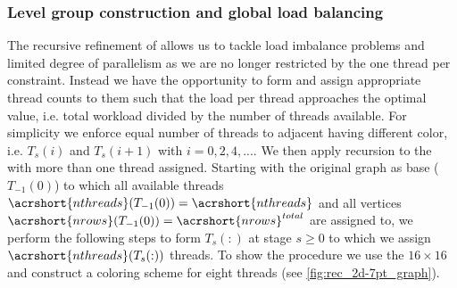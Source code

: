 \subsubsection{Level group construction and global load balancing} \label{subsec:subgraph_selection}

The recursive refinement of \levelGroups allows us to tackle load imbalance problems and limited degree of parallelism as we are no longer restricted by the one thread per \levelGroup constraint.  Instead we have the opportunity to form \levelGroups and assign appropriate thread counts to them such that the load per thread approaches the optimal value, i.e. total workload divided by the number of threads available. For simplicity we enforce equal number of threads to adjacent \levelGroups having different color, i.e. $T_s(i)$ and $T_s(i+1)$ with $i=0,2,4,...$. We then apply recursion to the \levelGroups with more than one thread assigned. Starting with the original graph as base \levelGroup ($T_{-1}(0)$) to which all available threads $\acrshort{nthreads}(T_{-1}(0))=\acrshort{nthreads}$ and all vertices $\acrshort{nrows}(T_{-1}(0))=\acrshort{nrows}^{total}$ are assigned to, we perform the following steps to form \levelGroups $T_s(:)$ at stage $s \ge 0$  to which we assign $\acrshort{nthreads}(T_{s}(:))$ threads. To show the procedure we use the $16 \times 16$ \stex and construct a coloring scheme for eight threads (see \cref{fig:rec_2d-7pt_graph}).

